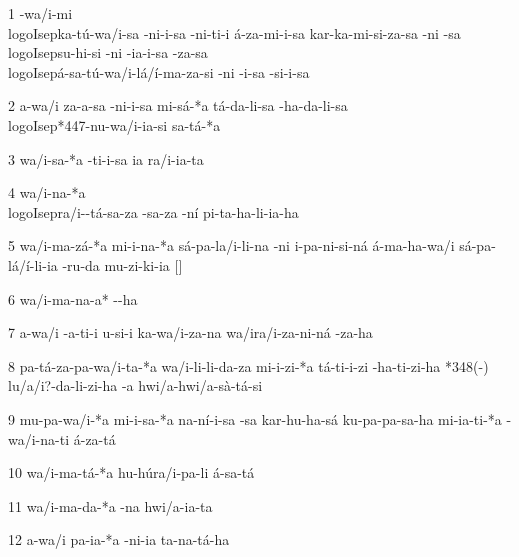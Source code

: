 1 -wa/i-mi \\logo{I}sep{}ka-tú-wa/i-sa -ni-i-sa -ni-ti-i á-za-mi-i-sa kar-ka-mi-si-za-sa \lmasc{}-ni -sa \\logo{I}sep{}su-hi-si \lmasc{}-ni -ia-i-sa \lmasc{}-za-sa \\logo{I}sep{}á-sa-tú-wa/i-lá/í-ma-za-si -ni -i-sa \lmasc{}-si-i-sa

2 a-wa/i za-a-sa -ni-i-sa mi-sá-*a \lmasc{}tá-da-li-sa -ha-da-li-sa \lbreak{} \\logo{I}sep{}*447-nu-wa/i-ia-si sa-tá-*a

3 wa/i-sa-*a -ti-i-sa \lmasc{} ia\logo{+} ra/i-ia-ta

4 wa/i-na-*a \\logo{I}sep{}ra/i--tá-sa-za \lmasc{}-sa-za -ní \lmasc{}pi-ta-ha-li-ia-ha

5 wa/i-ma-zá-*a mi-i-na-*a \lmasc{}sá-pa-la/i-li-na \lmasc{}-ni i-pa-ni-si-ná \lmasc{}á-ma-ha-wa/i \lmasc{}sá-pa-lá/í-li-ia -ru-da mu-zi-ki-ia \lmasc{}$[$$]$ \lbreak{}

6 wa/i-ma-na-a* \lmasc{}--ha

7 a-wa/i \lmasc{}-a-ti-i \lmasc{}u-si-i ka-wa/i-za-na \lmasc{}wa/i\logo{+}ra/i-za-ni-ná \lmasc{}-za-ha

8 pa-tá-za-pa-wa/i-ta-*a wa/i-li-li-da-za mi-i-zi-*a \lmasc{}tá-ti-i-zi -ha-ti-zi-ha \lmasc{}*348(-) lu/a/i?-da-li-zi-ha \lmasc{}-a hwi/a-hwi/a-sà-tá-si

9 mu-pa-wa/i-*a mi-i-sa-*a na-ní-i-sa \lbreak{}  -sa kar-hu-ha-sá ku-pa-pa-sa-ha mi-ia-ti-*a -wa/i-na-ti á-za-tá

10 wa/i-ma-tá-*a hu-hú\logo{+}ra/i-pa-li \lmasc{}á-sa-tá

11 wa/i-ma-da-*a \lmasc{}-na hwi/a-ia-ta

12 a-wa/i pa-ia-*a \lmasc{}-ni-ia ta-na-tá-ha

